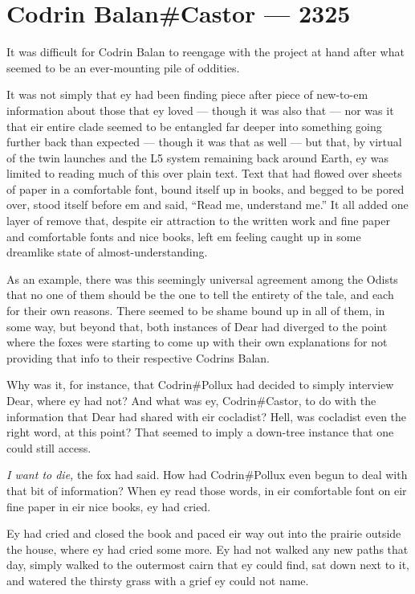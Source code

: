 \hypertarget{codrin-balancastor-2325}{%
\chapter{Codrin Balan\#Castor — 2325}\label{codrin-balancastor-2325}}

It was difficult for Codrin Balan to reengage with the project at hand after what seemed to be an ever-mounting pile of oddities.

It was not simply that ey had been finding piece after piece of new-to-em information about those that ey loved — though it was also that — nor was it that eir entire clade seemed to be entangled far deeper into something going further back than expected — though it was that as well — but that, by virtual of the twin launches and the L5 system remaining back around Earth, ey was limited to reading much of this over plain text. Text that had flowed over sheets of paper in a comfortable font, bound itself up in books, and begged to be pored over, stood itself before em and said, ``Read me, understand me.'' It all added one layer of remove that, despite eir attraction to the written work and fine paper and comfortable fonts and nice books, left em feeling caught up in some dreamlike state of almost-understanding.

As an example, there was this seemingly universal agreement among the Odists that no one of them should be the one to tell the entirety of the tale, and each for their own reasons. There seemed to be shame bound up in all of them, in some way, but beyond that, both instances of Dear had diverged to the point where the foxes were starting to come up with their own explanations for not providing that info to their respective Codrins Balan.

Why was it, for instance, that Codrin\#Pollux had decided to simply interview Dear, where ey had not? And what was ey, Codrin\#Castor, to do with the information that Dear had shared with eir cocladist? Hell, was cocladist even the right word, at this point? That seemed to imply a down-tree instance that one could still access.

\emph{I want to die,} the fox had said. How had Codrin\#Pollux even begun to deal with that bit of information? When ey read those words, in eir comfortable font on eir fine paper in eir nice books, ey had cried.

Ey had cried and closed the book and paced eir way out into the prairie outside the house, where ey had cried some more. Ey had not walked any new paths that day, simply walked to the outermost cairn that ey could find, sat down next to it, and watered the thirsty grass with a grief ey could not name.


